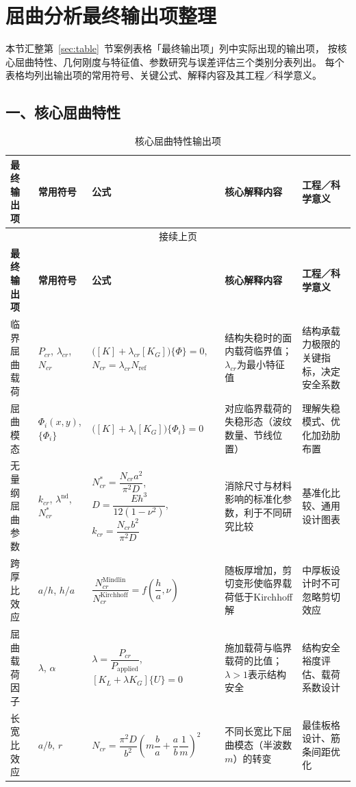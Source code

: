 \documentclass[12pt,a4paper]{article}
\begin{document}
\section{屈曲分析最终输出项整理}
\label{sec:outputs}

本节汇整第~\ref{sec:table}~节案例表格「最终输出项」列中实际出现的输出项，
按核心屈曲特性、几何刚度与特征值、参数研究与误差评估三个类别分表列出。
每个表格均列出输出项的常用符号、关键公式、解释内容及其工程／科学意义。

\clearpage
\thispagestyle{empty}
\begin{landscape}
\centering
\footnotesize
\setlength{\tabcolsep}{4pt}
\renewcommand{\arraystretch}{1.15}

\subsection*{一、核心屈曲特性}

\begin{longtable}{p{2.2cm}p{2.2cm}p{5.5cm}p{4.5cm}p{4.5cm}}
\caption{核心屈曲特性输出项} \label{tab:core_buck} \\
\toprule
\textbf{最终输出项} & \textbf{常用符号} & \textbf{公式} & \textbf{核心解释内容} & \textbf{工程／科学意义} \\
\midrule
\endfirsthead
\multicolumn{5}{c}{接续上页} \\
\toprule
\textbf{最终输出项} & \textbf{常用符号} & \textbf{公式} & \textbf{核心解释内容} & \textbf{工程／科学意义} \\
\midrule
\endhead
\bottomrule
\endfoot
临界屈曲载荷 & $P_{cr}$, $\lambda_{cr}$, $N_{cr}$ & $\bigl([K]+\lambda_{cr}[K_G]\bigr)\{\Phi\}=0$, $N_{cr}=\lambda_{cr}N_{\text{ref}}$ & 结构失稳时的面内载荷临界值；$\lambda_{cr}$为最小特征值 & 结构承载力极限的关键指标，决定安全系数 \\
\addlinespace
屈曲模态 & $\Phi_i(x,y)$, $\{\Phi_i\}$ & $\bigl([K]+\lambda_i[K_G]\bigr)\{\Phi_i\}=0$ & 对应临界载荷的失稳形态（波纹数量、节线位置） & 理解失稳模式、优化加劲肋布置 \\
\addlinespace
无量纲屈曲参数 & $k_{cr}$, $\lambda^{\text{nd}}$, $N_{cr}^*$ & $N_{cr}^*=\dfrac{N_{cr}a^2}{\pi^2D}$, $D=\dfrac{Eh^3}{12(1-\nu^2)}$, $k_{cr}=\dfrac{N_{cr}b^2}{\pi^2D}$ & 消除尺寸与材料影响的标准化参数，利于不同研究比较 & 基准化比较、通用设计图表 \\
\addlinespace
跨厚比效应 & $a/h$, $h/a$ & $\dfrac{N_{cr}^{\text{Mindlin}}}{N_{cr}^{\text{Kirchhoff}}} = f\left(\dfrac{h}{a},\nu\right)$ & 随板厚增加，剪切变形使临界载荷低于Kirchhoff解 & 中厚板设计时不可忽略剪切效应 \\
\addlinespace
屈曲载荷因子 & $\lambda$, $\alpha$ & $\lambda=\dfrac{P_{cr}}{P_{\text{applied}}}$, $[K_L+\lambda K_G]\{U\}=0$ & 施加载荷与临界载荷的比值；$\lambda>1$表示结构安全 & 结构安全裕度评估、载荷系数设计 \\
\addlinespace
长宽比效应 & $a/b$, $r$ & $N_{cr}=\dfrac{\pi^2D}{b^2}\left(m\dfrac{b}{a}+\dfrac{a}{b}\dfrac{1}{m}\right)^2$ & 不同长宽比下屈曲模态（半波数$m$）的转变 & 最佳板格设计、筋条间距优化 \\
\end{longtable}


\end{landscape}
\end{document}
